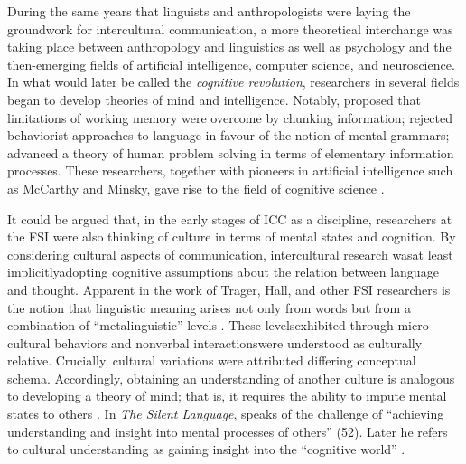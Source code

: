 During the same years that linguists and anthropologists were laying the groundwork for intercultural communication, a more theoretical interchange was taking place between anthropology and linguistics as well as psychology and the then-emerging fields of artificial intelligence, computer science, and neuroscience. In what would later be called the \textit{cognitive revolution}, researchers in several fields began to develop theories of mind and intelligence. Notably, \cite*{Miller1956a} proposed that limitations of working memory were overcome by chunking information; \cite*{Chomsky1959a} rejected behaviorist approaches to language in favour of the notion of mental grammars; \cite*{Newell1958a} advanced a theory of human problem solving in terms of elementary information processes. These researchers, together with pioneers in artificial intelligence such as McCarthy and Minsky, gave rise to the field of cognitive science \citep{Thagard2018a}.

It could be argued that, in the early stages of ICC as a discipline, researchers at the FSI were also thinking of culture in terms of mental states and cognition. By considering cultural aspects of communication, intercultural research was\textemdash at least implicitly\textemdash adopting cognitive assumptions about the relation between language and thought. Apparent in the work of Trager, Hall, and other FSI researchers is the notion that linguistic meaning arises not only from words but from a combination of ``metalinguistic'' levels \citep{LeedsHurwitz2013a}. These levels\textemdash exhibited through micro-cultural behaviors and nonverbal interactions\textemdash were understood as culturally relative. Crucially, cultural variations were attributed differing conceptual schema. Accordingly, obtaining an understanding of another culture is analogous to developing a theory of mind; that is, it requires the ability to impute mental states to others \citep{Premack1978a}. In \textit{The Silent Language}, \cite*{Hall1958a} speaks of the challenge of ``achieving understanding and insight into mental processes of others'' (52). Later he refers to cultural understanding as gaining insight into the ``cognitive world'' \citep[155]{Hall1966a}.

